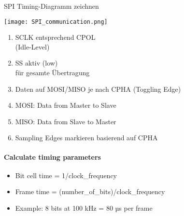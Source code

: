 \begin{KR}{SPI Timing-Diagramm zeichnen}
    \begin{minipage}{0.6\linewidth}
    \texttt{[image: SPI\_communication.png]}
    \end{minipage}
    \begin{minipage}{0.35\linewidth}
    \begin{enumerate}
        \item SCLK entsprechend CPOL \\ (Idle-Level)
        \item SS aktiv (low) \\ für gesamte Übertragung
        \item Daten auf MOSI/MISO je nach CPHA (Toggling Edge)
        \item MOSI: Data from Master to Slave
        \item MISO: Data from Slave to Master
        \item Sampling Edges markieren basierend auf CPHA
    \end{enumerate}
    \end{minipage}

    \paragraph{Calculate timing parameters}
    \begin{itemize}
        \item Bit cell time = 1/clock\_frequency
        \item Frame time = (number\_of\_bits)/clock\_frequency
        \item Example: 8 bits at 100 kHz = 80 µs per frame
    \end{itemize}

\end{KR}

